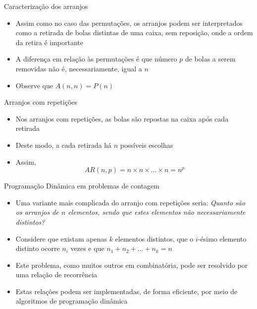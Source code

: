 \begin{frame}[fragile]{Caracterização dos arranjos}

    \begin{itemize}
        \item Assim como no caso das permutações, os arranjos podem ser interpretados como a
            retirada de bolas distintas de uma caixa, sem reposição, onde a ordem da retira é
            importante

        \item A diferença em relação às permutações é que número $p$ de bolas a serem removidas não
            é, necessariamente, igual a $n$

        \item Observe que $A(n, n) = P(n)$
    \end{itemize}

\end{frame}

\begin{frame}[fragile]{Arranjos com repetições}

    \begin{itemize}
        \item Nos arranjos com repetições, as bolas são repostas na caixa após cada retirada 

        \item Deste modo, a cada retirada há $n$ possíveis escolhas

        \item Assim,
    $$
        AR(n, p) = n \times n \times \ldots \times n = n^p
    $$
    \end{itemize}

\end{frame}

\begin{frame}[fragile]{Programação Dinâmica em problemas de contagem}

    \begin{itemize}
        \item Uma variante mais complicada do arranjo com repetições seria: \textit{Quanto são os
            arranjos de $n$ elementos, sendo que estes elementos não necessariamente distintos?}

        \item Considere que existam apenas $k$ elementos distintos, que o $i$-ésimo elemento 
            distinto ocorre $n_i$ vezes e que $n_1 + n_2 + \ldots + n_k = n$

        \item Este problema, como muitos outros em combinatória, pode ser resolvido por uma relação
           de recorrência

        \item Estas relações podem ser implementadas, de forma eficiente, por meio de algoritmos de
            programação dinâmica
    \end{itemize}

\end{frame}

